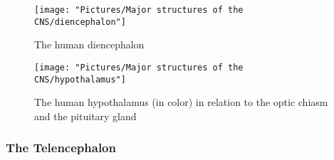 \documentclass[12pt,a4paper]{article}
\begin{document}
	
\begin{figure}
	\centering
	\texttt{[image: "Pictures/Major structures of the CNS/diencephalon"]}
	\caption{The human diencephalon}
	\label{fig:diencephalon}
\end{figure}


	
\begin{figure}
	\centering
	\texttt{[image: "Pictures/Major structures of the CNS/hypothalamus"]}
	\caption{The human hypothalamus (in color) in relation to the optic chiasm and the pituitary gland}
	\label{fig:hypothalamus}
\end{figure}
	\subsubsection{The Telencephalon}
\end{document}
